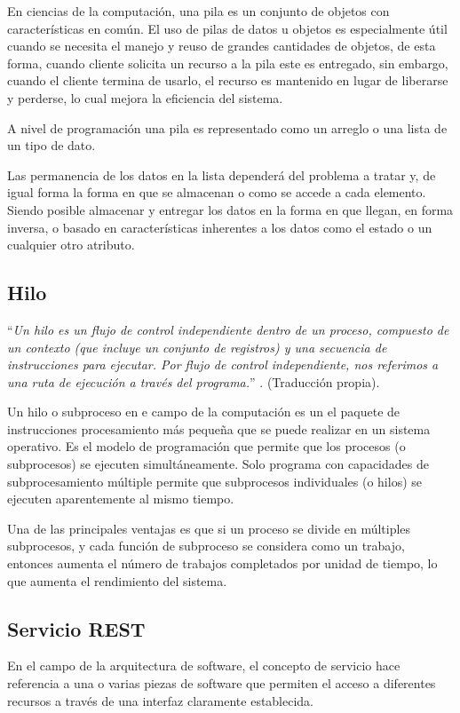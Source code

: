        En  ciencias de la computación, una pila es un conjunto de objetos con características en común. El uso de pilas de datos u objetos es especialmente útil cuando se necesita el manejo y reuso de grandes cantidades de objetos, de esta forma, cuando cliente solicita un recurso a la pila este es entregado, sin embargo, cuando el cliente termina de usarlo, el recurso es mantenido en lugar de liberarse y perderse, lo cual mejora la eficiencia del sistema.
        
        A nivel de programación una pila es representado como un arreglo o una lista de un tipo de dato.
        
        Las permanencia de los datos en la lista dependerá del problema a tratar y, de igual forma la forma en que se almacenan o como se accede a cada elemento. Siendo posible almacenar y entregar los datos en la forma en que llegan, en forma inversa, o basado en características inherentes a los datos como el estado o un cualquier otro atributo.
        
    \subsection{Hilo}
    \label{sub:FrameThread}
        ``\textit{Un hilo es un flujo de control independiente dentro de un proceso, compuesto de un contexto (que incluye un conjunto de registros) y una secuencia de instrucciones para ejecutar. Por flujo de control independiente, nos referimos a una ruta de ejecución a través del programa.}'' \cite[Pág. 58]{Wadleigh2000}. (Traducción propia).
    
        Un hilo o subproceso en e campo de la computación es un el paquete de instrucciones procesamiento más pequeña que se puede realizar en un sistema operativo. Es el modelo de programación que permite que los procesos (o subprocesos) se ejecuten simultáneamente. Solo programa con capacidades de subprocesamiento múltiple permite que subprocesos individuales (o hilos) se ejecuten aparentemente al mismo tiempo.
        
        Una de las principales ventajas es que si un proceso se divide en múltiples subprocesos, y cada función de subproceso se considera como un trabajo, entonces aumenta el número de trabajos completados por unidad de tiempo, lo que aumenta el rendimiento del sistema.
    
    \subsection{Servicio REST}
    \label{sub:FrameService}
        En el campo de la arquitectura de software, el concepto de servicio hace referencia a una o varias piezas de software que permiten el acceso a diferentes recursos a través de una interfaz claramente establecida.
        
